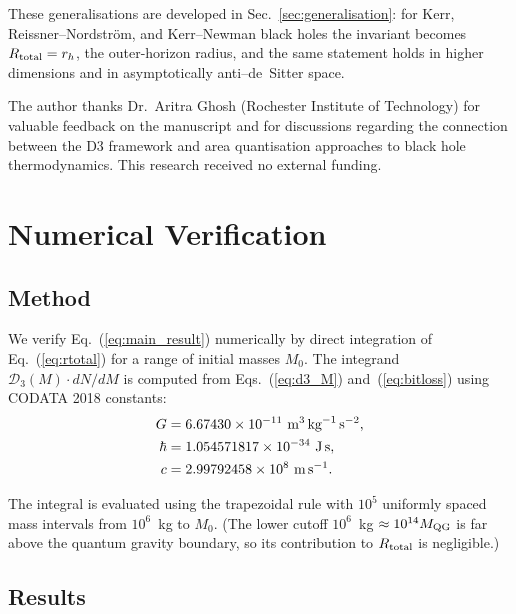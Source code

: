 \documentclass[aps,prd,twocolumn,showpacs,preprintnumbers,amsmath,amssymb,longbibliography]{revtex4-2}
\begin{document}
These generalisations are developed in Sec.~\ref{sec:generalisation}: for Kerr, Reissner--Nordstr\"om, and Kerr--Newman black holes the invariant becomes $R_{\rm total} = r_h$, the outer-horizon radius, and the same statement holds in higher dimensions and in asymptotically anti--de~Sitter space.

\begin{acknowledgments}
The author thanks Dr.\ Aritra Ghosh (Rochester Institute of Technology) for 
valuable feedback on the manuscript and for discussions regarding the connection 
between the D3 framework and area quantisation approaches to black hole 
thermodynamics. This research received no external funding.
\end{acknowledgments}

\appendix

\section{Numerical Verification}
\label{app:numerical}

\subsection{Method}

We verify Eq.~(\ref{eq:main_result}) numerically by direct integration of 
Eq.~(\ref{eq:rtotal}) for a range of initial masses $M_0$. The integrand 
$\mathcal{D}_3(M) \cdot dN/dM$ is computed from Eqs.~(\ref{eq:d3_M}) 
and~(\ref{eq:bitloss}) using CODATA 2018 constants:
\begin{align}
G &= 6.67430 \times 10^{-11}\ \text{m}^3\,\text{kg}^{-1}\,\text{s}^{-2}, \notag \\
\hbar &= 1.054571817 \times 10^{-34}\ \text{J\,s}, \notag \\
c &= 2.99792458 \times 10^8\ \text{m\,s}^{-1}. \notag
\end{align}

The integral is evaluated using the trapezoidal rule with $10^5$ uniformly spaced 
mass intervals from $10^6$~kg to $M_0$. (The lower cutoff $10^6$~kg $\approx 10^{14} M_{\rm QG}$ 
is far above the quantum gravity boundary, so its contribution to $R_{\rm total}$ 
is negligible.)

\subsection{Results}
\end{document}
